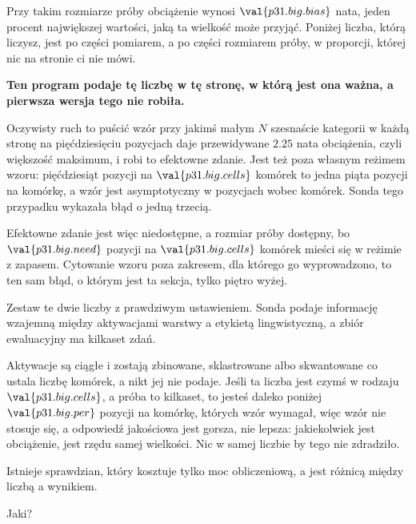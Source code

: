 \begin{fr}

Przy takim rozmiarze próby obciążenie wynosi $\val{p31.big.bias}$ nata,
jeden procent największej wartości, jaką ta wielkość może przyjąć. Poniżej
liczba, którą liczysz, jest po części pomiarem, a po części rozmiarem próby,
w proporcji, której nic na stronie ci nie mówi.

\begin{warning}
\textbf{Ten program podaje tę liczbę w tę stronę, w którą jest ona ważna, a
pierwsza wersja tego nie robiła.}

Oczywisty ruch to puścić wzór przy jakimś małym $N$ \dash{} szesnaście
kategorii w każdą stronę na pięćdziesięciu pozycjach daje przewidywane
$\num{2.25}$ nata obciążenia, czyli większość maksimum, i robi to efektowne
zdanie. Jest też poza własnym reżimem wzoru: pięćdziesiąt pozycji na
$\val{p31.big.cells}$ komórek to jedna piąta pozycji na komórkę, a wzór jest
asymptotyczny w pozycjach wobec komórek. Sonda tego przypadku wykazała błąd
o jedną trzecią.

Efektowne zdanie jest więc niedostępne, a rozmiar próby dostępny, bo
$\val{p31.big.need}$ pozycji na $\val{p31.big.cells}$ komórek mieści się w
reżimie z zapasem. Cytowanie wzoru poza zakresem, dla którego go
wyprowadzono, to ten sam błąd, o którym jest ta sekcja, tylko piętro wyżej.
\end{warning}
\end{fr}

\begin{fr}
\begin{aibox}
Zestaw te dwie liczby z prawdziwym ustawieniem. Sonda podaje informację
wzajemną między aktywacjami warstwy a etykietą lingwistyczną, a zbiór
ewaluacyjny ma kilkaset zdań.

Aktywacje są ciągłe i zostają zbinowane, sklastrowane albo skwantowane
\dash{} co ustala liczbę komórek, a nikt jej nie podaje. Jeśli ta liczba
jest czymś w rodzaju $\val{p31.big.cells}$, a próba to kilkaset, to jesteś
daleko poniżej $\val{p31.big.per}$ pozycji na komórkę, których wzór
wymagał, więc wzór nie stosuje się, a odpowiedź jakościowa jest gorsza, nie
lepsza: jakiekolwiek jest obciążenie, jest rzędu samej wielkości. Nic w
samej liczbie by tego nie zdradziło.

Istnieje sprawdzian, który kosztuje tylko moc obliczeniową, a jest różnicą
między liczbą a wynikiem.
\end{aibox}

Jaki?
\dotline
\nextframe
\end{fr}

